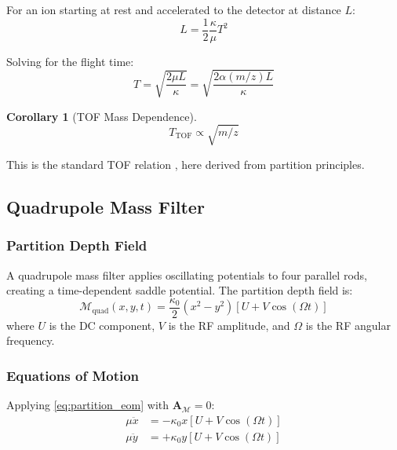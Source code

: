\documentclass[twocolumn,10pt,a4paper]{article}
\newtheorem{corollary}[theorem]{Corollary}
\theoremstyle{definition}
\theoremstyle{remark}
\newcommand{\Mdepth}{\mathcal{M}}
\newcommand{\Apartition}{\mathbf{A}_{\mathcal{M}}}
\newcommand{\partinert}{\mu}
\begin{document}
For an ion starting at rest and accelerated to the detector at distance $L$:
\begin{equation}
    L = \frac{1}{2}\frac{\kappa}{\partinert}T^2
\end{equation}

Solving for the flight time:
\begin{equation}
    T = \sqrt{\frac{2\partinert L}{\kappa}} = \sqrt{\frac{2\alpha(m/z)L}{\kappa}}
    \label{eq:tof_time}
\end{equation}

\begin{corollary}[TOF Mass Dependence]
\begin{equation}
    \boxed{T_{\mathrm{TOF}} \propto \sqrt{m/z}}
\end{equation}
\end{corollary}

This is the standard TOF relation \citep{wiley1955}, here derived from partition principles.

\subsection{Quadrupole Mass Filter}

\subsubsection{Partition Depth Field}

A quadrupole mass filter applies oscillating potentials to four parallel rods, creating a time-dependent saddle potential. The partition depth field is:
\begin{equation}
    \Mdepth_{\mathrm{quad}}(x, y, t) = \frac{\kappa_0}{2}(x^2 - y^2)[U + V\cos(\Omega t)]
    \label{eq:quad_field}
\end{equation}
where $U$ is the DC component, $V$ is the RF amplitude, and $\Omega$ is the RF angular frequency.

\subsubsection{Equations of Motion}

Applying \eqref{eq:partition_eom} with $\Apartition = 0$:
\begin{align}
    \partinert\ddot{x} &= -\kappa_0 x[U + V\cos(\Omega t)] \label{eq:quad_x} \\
    \partinert\ddot{y} &= +\kappa_0 y[U + V\cos(\Omega t)] \label{eq:quad_y}
\end{align}
\end{document}
